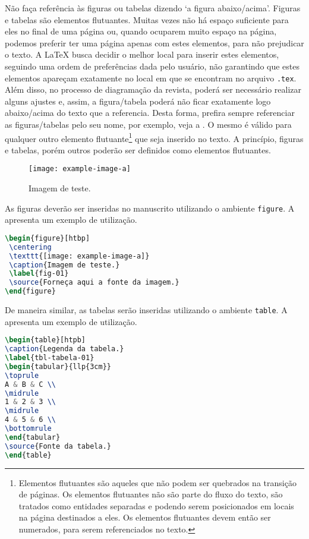 \documentclass{textolivre}
\begin{document}
Não faça referência às figuras ou tabelas dizendo `a figura abaixo/acima'.
Figuras e tabelas são elementos flutuantes. Muitas vezes não há espaço suficiente para
eles no final de uma página ou, quando ocuparem muito espaço na página, podemos preferir
ter uma página apenas com estes elementos, para não prejudicar o texto.
A \LaTeX{} busca decidir o melhor local para inserir estes elementos, seguindo uma ordem 
de preferências dada pelo usuário, não garantindo que estes elementos apareçam exatamente
no local em que se encontram no arquivo \verb|.tex|. Além disso, no processo de diagramação 
da revista, poderá ser necessário realizar alguns ajustes e, assim, a figura/tabela poderá 
não ficar exatamente logo abaixo/acima do texto que a referencia.
Desta forma, prefira sempre referenciar as figuras/tabelas pelo seu nome, 
por exemplo, veja a . O mesmo é válido para qualquer outro elemento flutuante\footnote{
Elementos flutuantes são aqueles que não podem ser quebrados na transição de páginas. 
Os elementos flutuantes não são parte do fluxo do texto, são tratados como entidades separadas 
e podendo serem posicionados em locais na página destinados a eles. Os elementos flutuantes devem então
ser numerados, para serem referenciados no texto. 
}
que seja inserido no texto. A princípio, figuras e tabelas, porém outros poderão ser definidos 
como elementos flutuantes. 

\begin{figure}[htbp]
 \centering
 \texttt{[image: example-image-a]}
 \caption{Imagem de teste.}
 \label{fig-img-a}
\end{figure}

As figuras deverão ser inseridas no manuscrito utilizando o ambiente \verb|figure|.
A  apresenta um exemplo de utilização.
\begin{lstlisting}[language=tex, label=lst-figure, caption={Inserindo uma figura.}]
\begin{figure}[htbp]
 \centering
 \texttt{[image: example-image-a]}
 \caption{Imagem de teste.}
 \label{fig-01}
 \source{Forneça aqui a fonte da imagem.}
\end{figure}
\end{lstlisting} %


\lipsum[12]


De maneira similar, as tabelas serão inseridas utilizando o ambiente \verb|table|.
A  apresenta um exemplo de utilização.
\begin{lstlisting}[language=tex, label=lst-table, caption={Inserindo uma tabela.}]
\begin{table}[htpb]
\caption{Legenda da tabela.}
\label{tbl-tabela-01}
\begin{tabular}{llp{3cm}}
\toprule 
A & B & C \\ 
\midrule
1 & 2 & 3 \\ 
\midrule
4 & 5 & 6 \\ 
\bottomrule
\end{tabular}
\source{Fonte da tabela.}
\end{table}
\end{lstlisting} %
\end{document}
